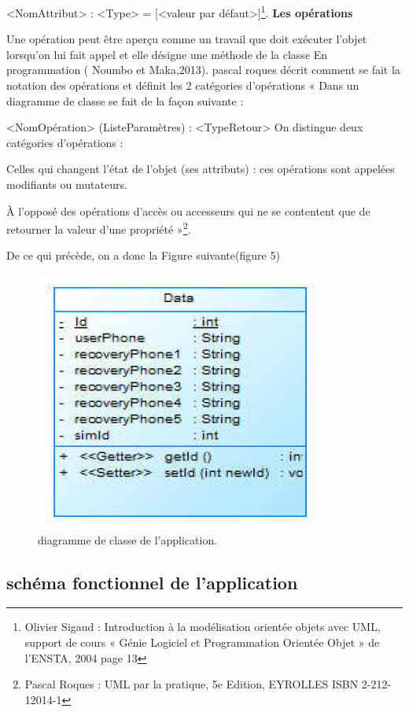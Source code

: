 \documentclass[a4paper, 12pt]{article}
\begin{document}
<NomAttribut> : <Type> = [<valeur par défaut>]\footnote{Olivier Sigaud : Introduction à la modélisation orientée objets avec UML, support de cours « Génie Logiciel et Programmation Orientée Objet » de l’ENSTA, 2004 page 13}.
\textbf{Les opérations} 

Une opération peut être aperçu comme un travail que doit exécuter  l’objet lorsqu’on lui fait appel et elle désigne une méthode de la classe En programmation ( Noumbo et Maka,2013). pascal roques décrit comment se fait la notation des opérations et définit les 2 catégories d'opérations « Dans un diagramme de classe  se fait de la façon suivante :

<NomOpération> (ListeParamètres) : <TypeRetour>
On distingue deux catégories d’opérations :

Celles qui changent l’état de l’objet (ses attributs) : ces opérations sont appelées modifiants ou mutateurs.

 À l’opposé des opérations d’accès ou accesseurs qui ne se
contentent que de retourner la valeur d’une propriété »\footnote{Pascal Roques : UML par la pratique, 5e Edition, EYROLLES ISBN 2-212-12014-1}.

De ce qui précède, on a donc la Figure suivante(figure 5)

\begin{figure}[h]
\begin{center}
\includegraphics[scale=0.75]{images3.png}
\end{center}
\caption{diagramme de classe de l’application.}
\end{figure}

\subsection{schéma fonctionnel de l'application}
\end{document}
